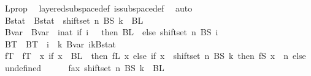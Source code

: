 \begin{isabellebody}
\ L{\isacharunderscore}{\kern0pt}prop\ \isamarkupfalse%
\ layered{\isacharunderscore}{\kern0pt}subspace{\isacharunderscore}{\kern0pt}def\ is{\isacharunderscore}{\kern0pt}subspace{\isacharunderscore}{\kern0pt}def\ \isamarkupfalse%
\ auto\isanewline
\isanewline
\ \ \ \ \isamarkupfalse%
\ Bstat\ \ {\isachardoublequoteopen}Bstat\ {\isasymequiv}\ shiftset\ n\ {\isacharparenleft}{\kern0pt}BS\ k{\isacharparenright}{\kern0pt}\ {\isasymunion}\ BL\ {}{\isachardoublequoteclose}\isanewline
\ \ \ \ \isamarkupfalse%
\ Bvar\ \ {\isachardoublequoteopen}Bvar\ {\isasymequiv}\ {\isacharparenleft}{\kern0pt}{\isasymlambda}i{\isacharcolon}{\kern0pt}{\isacharcolon}{\kern0pt}nat{\isachardot}{\kern0pt}\ {\isacharparenleft}{\kern0pt}if\ i\ {\isacharequal}{\kern0pt}\ {}\ then\ BL\ {}\ else\ shiftset\ n\ {\isacharparenleft}{\kern0pt}BS\ {\isacharparenleft}{\kern0pt}i\ {\isacharminus}{\kern0pt}\ {}{\isacharparenright}{\kern0pt}{\isacharparenright}{\kern0pt}{\isacharparenright}{\kern0pt}{\isacharparenright}{\kern0pt}{\isachardoublequoteclose}\isanewline
\ \ \ \ \isamarkupfalse%
\ BT\ \ {\isachardoublequoteopen}BT\ {\isasymequiv}\ {\isacharparenleft}{\kern0pt}{\isasymlambda}i\ {\isasymin}\ {\isacharbraceleft}{\kern0pt}{\isachardot}{\kern0pt}{\isachardot}{\kern0pt}{\isacharless}{\kern0pt}k{\isacharplus}{\kern0pt}{}{\isacharbraceright}{\kern0pt}{\isachardot}{\kern0pt}\ Bvar\ i{\isacharparenright}{\kern0pt}{\isacharparenleft}{\kern0pt}{\isacharparenleft}{\kern0pt}k{\isacharplus}{\kern0pt}{}{\isacharparenright}{\kern0pt}{\isacharcolon}{\kern0pt}{\isacharequal}{\kern0pt}Bstat{\isacharparenright}{\kern0pt}{\isachardoublequoteclose}\isanewline
\ \ \ \ \isamarkupfalse%
\ fT\ \ {\isachardoublequoteopen}fT\ {\isasymequiv}\ {\isacharparenleft}{\kern0pt}{\isasymlambda}x{\isachardot}{\kern0pt}\ {\isacharparenleft}{\kern0pt}if\ x\ {\isasymin}\ BL\ {}\ then\ fL\ x\ else\ {\isacharparenleft}{\kern0pt}if\ x\ {\isasymin}\ shiftset\ n\ {\isacharparenleft}{\kern0pt}BS\ k{\isacharparenright}{\kern0pt}\ then\ fS\ {\isacharparenleft}{\kern0pt}x\ {\isacharminus}{\kern0pt}\ n{\isacharparenright}{\kern0pt}\ else\ undefined{\isacharparenright}{\kern0pt}{\isacharparenright}{\kern0pt}{\isacharparenright}{\kern0pt}{\isachardoublequoteclose}\isanewline
\isanewline
\isanewline
\isanewline
\ \ \ \ \isamarkupfalse%
\ fax{}{\isacharcolon}{\kern0pt}\ {\isachardoublequoteopen}shiftset\ n\ {\isacharparenleft}{\kern0pt}BS\ k{\isacharparenright}{\kern0pt}\ {\isasyminter}\ BL\ {}\ {\isacharequal}{\kern0pt}\ {\isacharbraceleft}{\kern0pt}{\isacharbraceright}{\kern0pt}{\isachardoublequoteclose}\ \ \isamarkupfalse%

\end{isabellebody}
